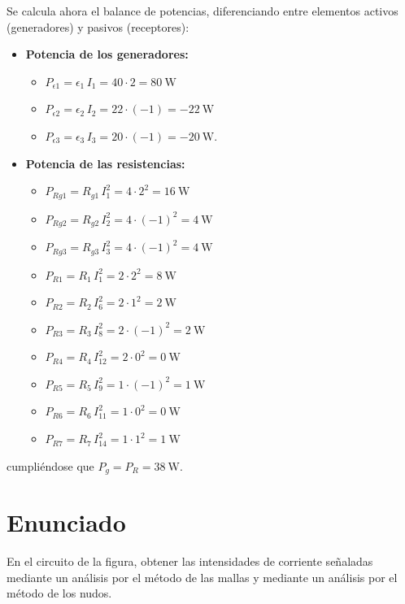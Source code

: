      Se calcula ahora el balance de potencias, diferenciando entre
     elementos activos (generadores) y pasivos (receptores):
     \begin{itemize}
     \item \textbf{Potencia de los generadores:}
       \begin{itemize}
       \item $P_{\epsilon1}=\epsilon_1\,I_1=40\cdot 2=\qty{80}{\watt}$
       \item $P_{\epsilon2}=\epsilon_2\,I_2=22\cdot (-1)= \qty{-22}{\watt}$
       \item $P_{\epsilon3}=\epsilon_3\,I_3=20\cdot (-1)= \qty{-20}{\watt}$.
       \end{itemize}
     \item \textbf{Potencia de las resistencias:}
       \begin{itemize}
       \item $P_{Rg1}=R_{g1}\,I_1^2=4\cdot 2^2=\qty{16}{\watt}$
       \item $P_{Rg2}=R_{g2}\,I_2^2=4\cdot (-1)^2=\qty{4}{\watt}$
       \item $P_{Rg3}=R_{g3}\,I_3^2=4\cdot (-1)^2=\qty{4}{\watt}$
       \item $P_{R1}=R_1\,I_1^2=2\cdot 2^2=\qty{8}{\watt}$
       \item $P_{R2}=R_2\,I_6^2=2\cdot 1^2=\qty{2}{\watt}$
       \item $P_{R3}=R_3\,I_8^2=2\cdot (-1)^2=\qty{2}{\watt}$
       \item $P_{R4}=R_4\,I_{12}^2=2\cdot 0^2=\qty{0}{\watt}$
       \item $P_{R5}=R_5\,I_9^2=1\cdot (-1)^2=\qty{1}{\watt}$
       \item $P_{R6}=R_6\,I_{11}^2=1\cdot 0^2=\qty{0}{\watt}$
       \item $P_{R7}=R_7\,I_{14}^2=1\cdot 1^2=\qty{1}{\watt}$
       \end{itemize}
     \end{itemize}
     cumpliéndose que $P_g = P_R = \qty{38}{\watt}$.

     \section{Enunciado}
     En el circuito de la figura, obtener las intensidades de
     corriente señaladas mediante un análisis por el método de las
     mallas y mediante un análisis por el método de los nudos.

